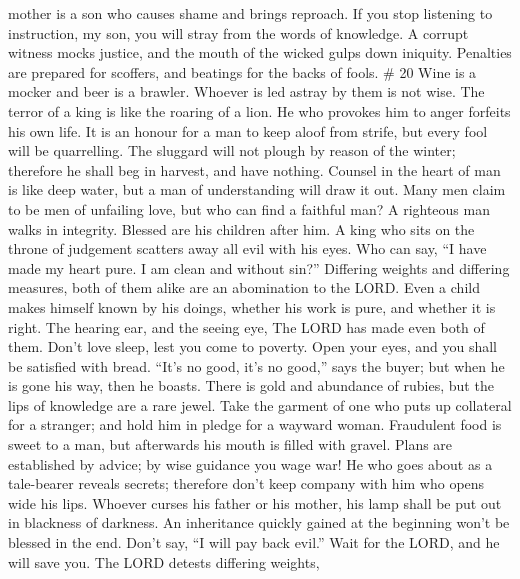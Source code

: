 mother is a son who causes shame and brings reproach.  If
you stop listening to instruction, my son, you will stray from the words
of knowledge.  A corrupt witness mocks justice, and the
mouth of the wicked gulps down iniquity.  Penalties are
prepared for scoffers, and beatings for the backs of fools. \# 20
 Wine is a mocker and beer is a brawler. Whoever is led
astray by them is not wise.  The terror of a king is like
the roaring of a lion. He who provokes him to anger forfeits his own
life.  It is an honour for a man to keep aloof from strife,
but every fool will be quarrelling.  The sluggard will not
plough by reason of the winter; therefore he shall beg in harvest, and
have nothing.  Counsel in the heart of man is like deep
water, but a man of understanding will draw it out.  Many
men claim to be men of unfailing love, but who can find a faithful man?
 A righteous man walks in integrity. Blessed are his
children after him.  A king who sits on the throne of
judgement scatters away all evil with his eyes.  Who can
say, ``I have made my heart pure. I am clean and without sin?''
 Differing weights and differing measures, both of them
alike are an abomination to the LORD.  Even a child makes
himself known by his doings, whether his work is pure, and whether it is
right.  The hearing ear, and the seeing eye, The LORD has
made even both of them.  Don't love sleep, lest you come to
poverty. Open your eyes, and you shall be satisfied with bread.
 ``It's no good, it's no good,'' says the buyer; but when
he is gone his way, then he boasts.  There is gold and
abundance of rubies, but the lips of knowledge are a rare jewel.
 Take the garment of one who puts up collateral for a
stranger; and hold him in pledge for a wayward woman. 
Fraudulent food is sweet to a man, but afterwards his mouth is filled
with gravel.  Plans are established by advice; by wise
guidance you wage war!  He who goes about as a tale-bearer
reveals secrets; therefore don't keep company with him who opens wide
his lips.  Whoever curses his father or his mother, his
lamp shall be put out in blackness of darkness.  An
inheritance quickly gained at the beginning won't be blessed in the end.
 Don't say, ``I will pay back evil.'' Wait for the LORD,
and he will save you.  The LORD detests differing weights,
